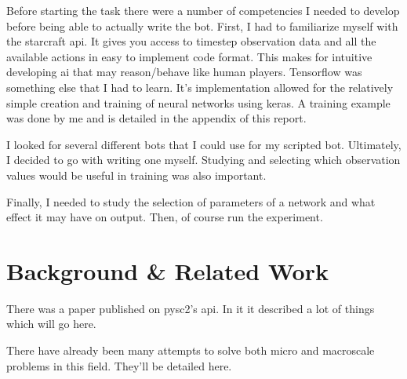 \documentclass{amsart}
\newcounter{temp}
\theoremstyle{definition}
\begin{document}
Before starting the task there were a number of competencies I needed to develop before being able to actually write the bot.
First, I had to familiarize myself with the starcraft api.
It gives you access to timestep observation data and all the available actions in easy to implement code format.
This makes for intuitive developing ai that may reason/behave like human players.
Tensorflow was something else that I had to learn.
It's implementation allowed for the relatively simple creation and training of neural networks using keras.
A training example was done by me and is detailed in the appendix of this report.

I looked for several different bots that I could use for my scripted bot.
Ultimately, I decided to go with writing one myself.
Studying and selecting which observation values would be useful in training was also important.

Finally, I needed to study the selection of parameters of a network and what effect it may have on output.
Then, of course run the experiment.








\section{Background \& Related Work}


There was a paper published on pysc2's api.
In it it described a lot of things which will go here.

There have already been many attempts to solve both micro and macroscale problems in this field.
They'll be detailed here.


\end{document}
